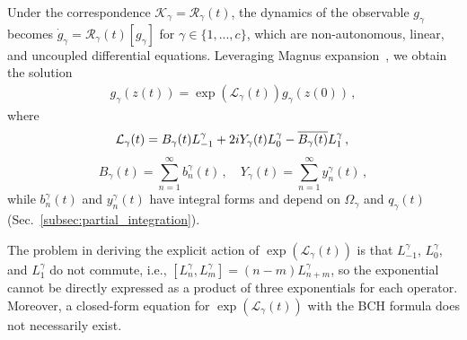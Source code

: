 \documentclass[aps,pre,reprint,longbibliography,superscriptaddress,noshowpacs,floatfix]{revtex4-2}
\theoremstyle{definition}
\theoremstyle{remark}
\begin{document}
Under the correspondence $\mathcal{K}_{\gamma} = \mathcal{R}_{\gamma}(t)$, the dynamics of the observable $g_\gamma$ becomes $\dot{g}_\gamma = \mathcal{R}_{\gamma}(t)[g_\gamma]$ for $\gamma \in \{1,...,c\}$, which are non-autonomous, linear, and uncoupled differential equations. Leveraging Magnus expansion~\cite{Magnus1954, *Blanes2009}, we obtain the solution
\begin{align}\label{eq:formal_solution}
    g_{\gamma}(z(t)) = \exp\left(\mathcal{L}_{\gamma}(t)\right)g_{\gamma}(z(0))\,,
\end{align}
where
\begin{equation}
    \mathcal{L}_{\gamma}(t) = B_{\gamma}(t)L_{-1}^{\gamma} + 2iY_{\gamma}(t)L_0^{\gamma} - \overline{B_{\gamma}(t)}L_1^{\gamma}\,,\\
\end{equation}
\begin{equation}
    B_{\gamma}(t) = \sum_{n=1}^\infty b_n^{\gamma}(t)\,,\quad 
    Y_{\gamma}(t) = \sum_{n=1}^\infty y_n^{\gamma}(t)\,,
\end{equation}
while $b_n^{\gamma}(t)$ and $y_n^{\gamma}(t)$ have integral forms and depend on $\Omega_\gamma$ and $q_{\gamma}(t)$ (Sec.~\ref{subsec:partial_integration}). 

The problem in deriving the explicit action of $\exp\left(\mathcal{L}_{\gamma}(t)\right)$ is that $L_{-1}^{\gamma}$, $L_0^{\gamma}$, and $L_1^{\gamma}$ do not commute, i.e., $[L_n^{\gamma}, L_m^{\gamma}] = (n - m)L_{n + m}^{\gamma}$, so the exponential cannot be directly expressed as a product of three exponentials for each operator. Moreover, a closed-form equation for $\exp\left(\mathcal{L}_{\gamma}(t)\right)$ with the BCH formula does not necessarily exist.
\end{document}
